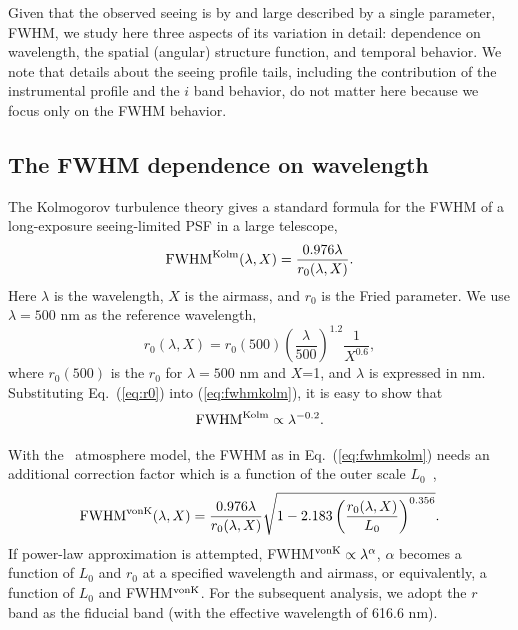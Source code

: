 

Given that the observed seeing is by and large described by a single parameter, FWHM, 
we study here three aspects of its variation in detail: dependence on wavelength,
the spatial (angular) structure function, and temporal behavior. We note that details 
about the seeing profile tails, including the contribution of the instrumental profile and
the $i$ band behavior, do not matter here because we focus only on the FWHM behavior. 

\subsection{The FWHM dependence on wavelength} 

The Kolmogorov turbulence theory gives a standard formula for the FWHM of a long-exposure
seeing-limited PSF in a large telescope,
\begin{equation}
\textrm{FWHM}^{\rm Kolm}(\lambda, X) = \frac{0.976\lambda}{r_0(\lambda,X)}.
\label{eq:fwhmkolm}
\end{equation}
Here $\lambda$ is the wavelength, $X$ is the airmass, and $r_0$ is the Fried parameter.
We use $\lambda = 500$ nm as the reference wavelength,
\begin{equation}
\label{eq:airmass}
r_0(\lambda,X) = r_0(500) \left(\frac{\lambda}{500}\right)^{1.2}
\frac{1}{X^{0.6}},
\label{eq:r0}
\end{equation}
where $r_0(500)$ is the $r_0$ for $\lambda=500$ nm and $X$=1, and $\lambda$ is 
expressed in nm.
Substituting Eq.~(\ref{eq:r0}) into (\ref{eq:fwhmkolm}), it is easy to show that 
\begin{equation}
\textrm{FWHM}^{\rm Kolm} \propto \lambda^{-0.2}.
\end{equation}


With the \vk~atmosphere model, the FWHM as in
Eq.~(\ref{eq:fwhmkolm}) needs an additional correction factor
which is a function of the outer scale $L_0$~\citep{Tokovinin2002},
\begin{equation}
\textrm{FWHM}^{\rm vonK}(\lambda, X) = \frac{0.976\lambda}{r_0(\lambda,X)}
\sqrt{1-2.183\left( \frac{r_0(\lambda,X) }{L_0} \right)^{0.356}}.
\end{equation}
If power-law approximation is attempted,  FWHM$^{\rm vonK} \propto \lambda^{\alpha} $, 
$\alpha$ becomes a function of $L_0$ and $r_0$ at a specified
wavelength and airmass, or equivalently, a function of $L_0$ and FWHM$^{\rm vonK}$.
For the subsequent analysis, we adopt the $r$ band as the fiducial band (with
the effective wavelength of 616.6 nm).


